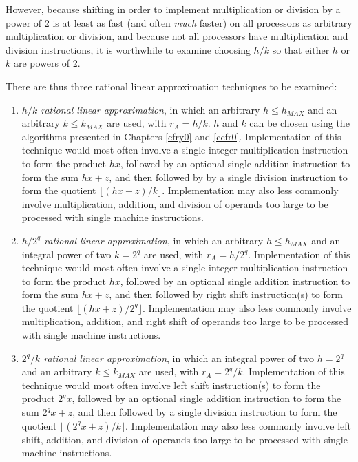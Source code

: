 However, because shifting in order
to implement multiplication or division by a power of 2 
is at least as fast (and often \emph{much} faster)
on all processors as arbitrary multiplication or division, 
and because not all processors have multiplication and division instructions,
it is worthwhile to examine choosing $h/k$ so that either $h$ or $k$ are 
powers of 2.

There are thus three rational linear approximation techniques to be
examined:

\begin{enumerate}
\item \emph{$h/k$ rational linear approximation}, in which an arbitrary
      $h \leq h_{MAX}$ and an arbitrary $k \leq k_{MAX}$ are used,
	  with $r_A = h/k$.  $h$ and $k$ can be chosen using the algorithms
	  presented in Chapters \ref{cfry0} and \ref{ccfr0}.
	  Implementation of this technique would most often involve a single integer
	  multiplication instruction to form the product $hx$, followed by an optional single
	  addition instruction to form the sum $hx+z$, and then 
	  followed by by a single division instruction
	  to form the quotient $\lfloor (hx+z)/k \rfloor$.  Implementation may also less commonly involve
	  multiplication, addition, and division of operands too large to be processed
	  with single machine instructions.
\item \emph{$h/2^q$ rational linear approximation}, in which an arbitrary 
      $h \leq h_{MAX}$ and an integral power of two $k=2^q$ are used, with
	  $r_A = h/2^q$.
	  Implementation of this technique would most often involve a single integer
	  multiplication instruction to form the product $hx$, followed by an optional single
	  addition instruction to form the sum $hx+z$, and then 
	  followed by right shift instruction(s)
	  to form the quotient $\lfloor (hx+z)/2^q \rfloor$.  Implementation may also less commonly involve
	  multiplication, addition, and right shift of operands too large to be processed
	  with single machine instructions.
\item \emph{$2^q/k$ rational linear approximation}, in which an integral
      power of two $h=2^q$ and an arbitrary $k \leq k_{MAX}$ are used, with
	  $r_A = 2^q/k$.
	  Implementation of this technique would most often involve left shift
	  instruction(s) to form the product $2^qx$, followed by an optional single
	  addition instruction to form the sum $2^qx+z$, and then 
	  followed by a single division instruction to form 
	  the quotient $\lfloor (2^qx+z)/k \rfloor$.  Implementation may also less 
	  commonly involve
	  left shift, addition, and division of operands too large to be processed
	  with single machine instructions.
\end{enumerate}

